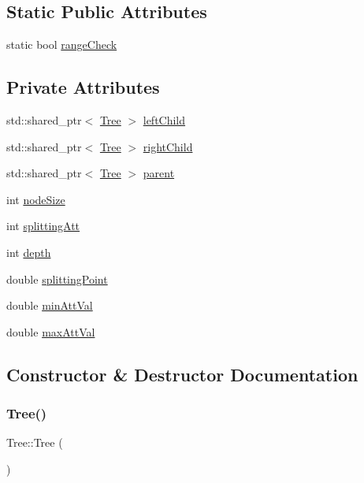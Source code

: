 \subsection*{Static Public Attributes}
\begin{DoxyCompactItemize}
\item 
static bool \hyperlink{classTree_a0acb952dac4fe2f6321f212402a8f159}{range\+Check}
\end{DoxyCompactItemize}
\subsection*{Private Attributes}
\begin{DoxyCompactItemize}
\item 
std\+::shared\+\_\+ptr$<$ \hyperlink{classTree}{Tree} $>$ \hyperlink{classTree_a6fcca508488527e9028456375504e51e}{left\+Child}
\item 
std\+::shared\+\_\+ptr$<$ \hyperlink{classTree}{Tree} $>$ \hyperlink{classTree_af4d184b80d0e81e70d531911344a418b}{right\+Child}
\item 
std\+::shared\+\_\+ptr$<$ \hyperlink{classTree}{Tree} $>$ \hyperlink{classTree_ae042f82923500e0d34b82510cd02789a}{parent}
\item 
int \hyperlink{classTree_a3748ddc223ca3f6816de3f631026eb73}{node\+Size}
\item 
int \hyperlink{classTree_aae862b9dbe28c1f9d14ad408569b3078}{splitting\+Att}
\item 
int \hyperlink{classTree_aee829f12b9755333a0196190fbe07f1b}{depth}
\item 
double \hyperlink{classTree_a0aeb8a2115f635608ca9a9b0304d304c}{splitting\+Point}
\item 
double \hyperlink{classTree_a8f68db34d3b557765890aeb92f5d6f38}{min\+Att\+Val}
\item 
double \hyperlink{classTree_a4434a97ce3969349d711c0830df1661c}{max\+Att\+Val}
\end{DoxyCompactItemize}


\subsection{Constructor \& Destructor Documentation}
\mbox{\label{classTree_ad376a7c639d857312f5de2ef47482f68}} 
\subsubsection{\texorpdfstring{Tree()}{Tree()}}
{\footnotesize\ttfamily Tree\+::\+Tree (\begin{DoxyParamCaption}{ }\end{DoxyParamCaption})\hspace{0.3cm}{\ttfamily [inline]}}

